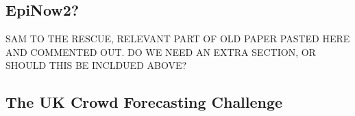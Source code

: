 \documentclass[10pt,a4paper,twocolumn]{article}
\begin{document}
\subsection*{EpiNow2?}

SAM TO THE RESCUE, RELEVANT PART OF OLD PAPER PASTED HERE AND COMMENTED OUT. DO WE NEED AN EXTRA SECTION, OR SHOULD THIS BE INCLDUED ABOVE? 

% 

\subsection*{The UK Crowd Forecasting Challenge}
\end{document}
